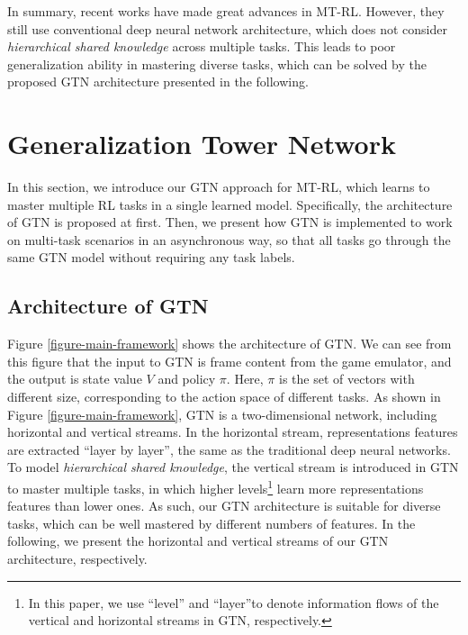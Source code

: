 \documentclass[letterpaper]{article} %
\begin{document}
In summary, recent works have made great advances in MT-RL. However, they still use conventional deep neural network architecture, which does not consider \textit{hierarchical shared knowledge} across multiple tasks. This leads to poor generalization ability in mastering diverse tasks, which can be solved by the proposed GTN architecture presented in the following.


\section{Generalization Tower Network}

In this section, we introduce our GTN approach for MT-RL, which learns to master multiple RL tasks in a single learned model.
Specifically, the architecture of GTN is proposed at first.
Then, we present how GTN is implemented to work on multi-task scenarios in an asynchronous way, so that all tasks go through the same GTN model without requiring any task labels.

\subsection{Architecture of GTN}
\label{section-archi-of-gtn}


Figure \ref{figure-main-framework} shows the architecture of GTN.
We can see from this figure that the input to GTN is frame content from the game emulator, and the output is state value $V$ and policy $\pi$.
Here, $\pi$ is the set of vectors with different size, corresponding to the action space of different tasks.
As shown in Figure \ref{figure-main-framework}, GTN is a two-dimensional network, including horizontal and vertical streams.
In the horizontal stream, representations features are extracted ``layer by layer'', the same as the traditional deep neural networks. To model \textit{hierarchical shared knowledge}, the vertical stream is introduced in GTN to master multiple tasks, in which higher levels\footnote{In this paper, we use ``level'' and ``layer''to denote information flows of the vertical and horizontal streams in GTN, respectively. } learn more representations features than lower ones.
As such, our GTN architecture is suitable for diverse tasks, which can be well mastered by different numbers of features.
In the following, we present the horizontal and vertical streams of our GTN architecture, respectively.
\end{document}
